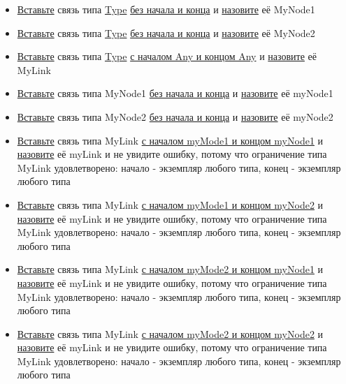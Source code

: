 \documentclass{article}
\begin{document}
\begin{itemize}
  \item \hyperlink{DeepCase.InsertLink.Def}{Вставьте} связь типа \hyperlink{type.Def}{Type} \hyperlink{FAQ.HowToInsertLinkWithoutFromAndTo}{без начала и конца} и \hyperlink{FAQ.HowToSetName}{назовите} её MyNode1
  \item \hyperlink{DeepCase.InsertLink.Def}{Вставьте} связь типа \hyperlink{type.Def}{Type} \hyperlink{FAQ.HowToInsertLinkWithoutFromAndTo}{без начала и конца} и \hyperlink{FAQ.HowToSetName}{назовите} её MyNode2
  \item \hyperlink{DeepCase.InsertLink.Def}{Вставьте} связь типа \hyperlink{type.Def}{Type} \hyperlink{FAQ.HowToInsertLinkWithFromAndTo}{с началом Any и концом Any} и \hyperlink{FAQ.HowToSetName}{назовите} её MyLink
  \item \hyperlink{DeepCase.InsertLink.Def}{Вставьте} связь типа MyNode1 \hyperlink{FAQ.HowToInsertLinkWithoutFromAndTo}{без начала и конца} и \hyperlink{FAQ.HowToSetName}{назовите} её myNode1
  \item \hyperlink{DeepCase.InsertLink.Def}{Вставьте} связь типа MyNode2 \hyperlink{FAQ.HowToInsertLinkWithoutFromAndTo}{без начала и конца} и \hyperlink{FAQ.HowToSetName}{назовите} её myNode2
  \item \hyperlink{DeepCase.InsertLink.Def}{Вставьте} связь типа MyLink \hyperlink{FAQ.HowToInsertLinkWithFromAndTo}{с началом myMode1 и концом myNode1} и \hyperlink{FAQ.HowToSetName}{назовите} её myLink и не увидите ошибку, потому что ограничение типа MyLink удовлетворено: начало - экземпляр любого типа, конец - экземпляр любого типа
  \item \hyperlink{DeepCase.InsertLink.Def}{Вставьте} связь типа MyLink \hyperlink{FAQ.HowToInsertLinkWithFromAndTo}{с началом myMode1 и концом myNode2} и \hyperlink{FAQ.HowToSetName}{назовите} её myLink и не увидите ошибку, потому что ограничение типа MyLink удовлетворено: начало - экземпляр любого типа, конец - экземпляр любого типа
  \item \hyperlink{DeepCase.InsertLink.Def}{Вставьте} связь типа MyLink \hyperlink{FAQ.HowToInsertLinkWithFromAndTo}{с началом myMode2 и концом myNode1} и \hyperlink{FAQ.HowToSetName}{назовите} её myLink и не увидите ошибку, потому что ограничение типа MyLink удовлетворено: начало - экземпляр любого типа, конец - экземпляр любого типа
  \item \hyperlink{DeepCase.InsertLink.Def}{Вставьте} связь типа MyLink \hyperlink{FAQ.HowToInsertLinkWithFromAndTo}{с началом myMode2 и концом myNode2} и \hyperlink{FAQ.HowToSetName}{назовите} её myLink и не увидите ошибку, потому что ограничение типа MyLink удовлетворено: начало - экземпляр любого типа, конец - экземпляр любого типа
\end{itemize}
\end{document}
